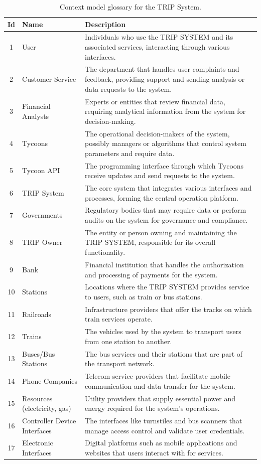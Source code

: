 \begin{table}[H]
\centering
\begin{tabular}{@{}clp{9cm}@{}}
\toprule
\textbf{Id} & \textbf{Name} & \textbf{Description} \\
\midrule
1 & User & Individuals who use the TRIP SYSTEM and its associated services, interacting through various interfaces. \\
2 & Customer Service & The department that handles user complaints and feedback, providing support and sending analysis or data requests to the system. \\
3 & Financial Analysts & Experts or entities that review financial data, requiring analytical information from the system for decision-making. \\
4 & Tycoons & The operational decision-makers of the system, possibly managers or algorithms that control system parameters and require data. \\
5 & Tycoon API & The programming interface through which Tycoons receive updates and send requests to the system. \\
6 & TRIP System & The core system that integrates various interfaces and processes, forming the central operation platform. \\
7 & Governments & Regulatory bodies that may require data or perform audits on the system for governance and compliance. \\
8 & TRIP Owner & The entity or person owning and maintaining the TRIP SYSTEM, responsible for its overall functionality. \\
9 & Bank & Financial institution that handles the authorization and processing of payments for the system. \\
10 & Stations & Locations where the TRIP SYSTEM provides service to users, such as train or bus stations. \\
11 & Railroads & Infrastructure providers that offer the tracks on which train services operate. \\
12 & Trains & The vehicles used by the system to transport users from one station to another. \\
13 & Buses/Bus Stations & The bus services and their stations that are part of the transport network. \\
14 & Phone Companies & Telecom service providers that facilitate mobile communication and data transfer for the system. \\
15 & Resources (electricity, gas) & Utility providers that supply essential power and energy required for the system’s operations. \\
16 & Controller Device Interfaces & The interfaces like turnstiles and bus scanners that manage access control and validate user credentials. \\
17 & Electronic Interfaces & Digital platforms such as mobile applications and websites that users interact with for services. \\
\bottomrule
\end{tabular}
\caption{Context model glossary for the TRIP System.}
\label{tab:glossary_context_view}
\end{table}


